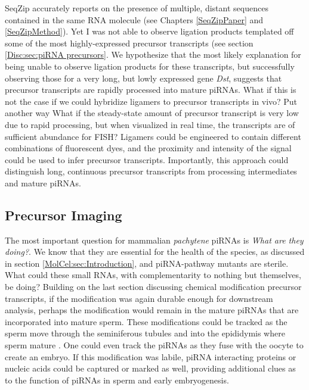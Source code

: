     
    SeqZip accurately reports on the presence of multiple, distant sequences contained in the same RNA molecule (see Chapters \ref{SeqZipPaper} and \ref{SeqZipMethod}). Yet I was not able to observe ligation products templated off some of the most highly-expressed precursor transcripts (see section \ref{Disc:sec:piRNA precursors}. We hypothesize that the most likely explanation for being unable to observe ligation products for these transcripts, but successfully observing those for a very long, but lowly expressed gene \textit{Dst}, suggests that precursor transcripts are rapidly processed into mature piRNAs. What if this is not the case if we could hybridize ligamers to precursor transcripts in vivo? Put another way \textemdash What if the steady-state amount of precursor transcript is very low due to rapid processing, but when visualized in real time, the transcripts are of sufficient abundance for FISH? Ligamers could be engineered to contain different combinations of fluorescent dyes, and the proximity and intensity of the signal could be used to infer precursor transcripts. Importantly, this approach could distinguish long, continuous precursor transcripts from processing intermediates and mature piRNAs.

  \subsection{Precursor Imaging}
    \label{Disc:subsec:Imaging of precursors}

    The most important question for mammalian \textit{pachytene} piRNAs is \textit{What are they doing?}. We know that they are essential for the health of the species, as discussed in section \ref{MolCel:sec:Introduction}, and piRNA-pathway mutants are sterile. What could these small RNAs, with complementarity to nothing but themselves, be doing? Building on the last section discussing chemical modification precursor transcripts, if the modification was again durable enough for downstream analysis, perhaps the modification would remain in the mature piRNAs that are incorporated into mature sperm. These modifications could be tracked as the sperm move through the seminiferous tubules and into the epididymis where sperm mature \citep{Jones1999}. One could even track the piRNAs as they fuse with the oocyte to create an embryo. If this modification was labile, piRNA interacting proteins or nucleic acids could be captured or marked as well, providing additional clues as to the function of piRNAs in sperm and early embryogenesis.

